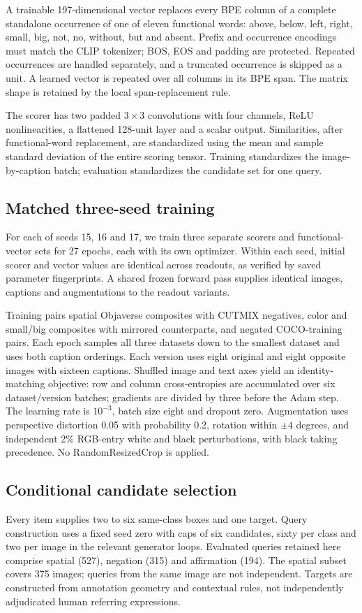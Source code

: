 \documentclass[10pt,twocolumn,letterpaper]{article}
\begin{document}
A trainable 197-dimensional vector replaces every BPE column of a complete standalone occurrence of one of eleven functional words: above, below, left, right, small, big, not, no, without, but and absent. Prefix and occurrence encodings must match the CLIP tokenizer; BOS, EOS and padding are protected. Repeated occurrences are handled separately, and a truncated occurrence is skipped as a unit. A learned vector is repeated over all columns in its BPE span. The matrix shape is retained by the local span-replacement rule.

The scorer has two padded $3\times3$ convolutions with four channels, ReLU nonlinearities, a flattened 128-unit layer and a scalar output. Similarities, after functional-word replacement, are standardized using the mean and sample standard deviation of the entire scoring tensor. Training standardizes the image-by-caption batch; evaluation standardizes the candidate set for one query.

\subsection{Matched three-seed training}
For each of seeds 15, 16 and 17, we train three separate scorers and functional-vector sets for 27 epochs, each with its own optimizer. Within each seed, initial scorer and vector values are identical across readouts, as verified by saved parameter fingerprints. A shared frozen forward pass supplies identical images, captions and augmentations to the readout variants.

Training pairs spatial Objaverse composites with CUTMIX negatives, color and small/big composites with mirrored counterparts, and negated COCO-training pairs. Each epoch samples all three datasets down to the smallest dataset and uses both caption orderings. Each version uses eight original and eight opposite images with sixteen captions. Shuffled image and text axes yield an identity-matching objective: row and column cross-entropies are accumulated over six dataset/version batches; gradients are divided by three before the Adam step. The learning rate is $10^{-3}$, batch size eight and dropout zero. Augmentation uses perspective distortion 0.05 with probability 0.2, rotation within $\pm4$ degrees, and independent 2\% RGB-entry white and black perturbations, with black taking precedence. No RandomResizedCrop is applied.

\subsection{Conditional candidate selection}
Every item supplies two to six same-class boxes and one target. Query construction uses a fixed seed zero with caps of six candidates, sixty per class and two per image in the relevant generator loops. Evaluated queries retained here comprise spatial (527), negation (315) and affirmation (194). The spatial subset covers 375 images; queries from the same image are not independent. Targets are constructed from annotation geometry and contextual rules, not independently adjudicated human referring expressions.
\end{document}

